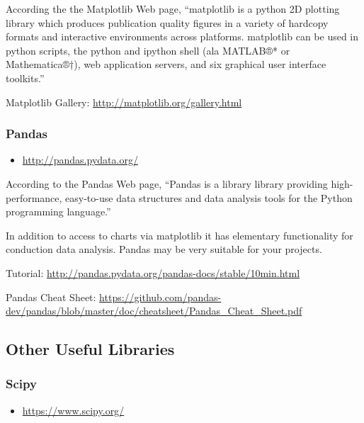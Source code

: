 According the the Matplotlib Web page, ``matplotlib is a python 2D
plotting library which produces publication quality figures in a
variety of hardcopy formats and interactive environments across
platforms. matplotlib can be used in python scripts, the python and
ipython shell (ala MATLAB®* or Mathematica®†), web application
servers, and six graphical user interface toolkits.''

Matplotlib Gallery: \url{http://matplotlib.org/gallery.html}


\subsubsection{Pandas}
\label{\detokenize{lesson/prg/python_big_data:id5}}\begin{itemize}
\item {} 
\url{http://pandas.pydata.org/}

\end{itemize}

According to the Pandas Web page, ``Pandas is a library library
providing high-performance, easy-to-use data structures and data
analysis tools for the Python programming language.''

In addition to access to charts via matplotlib it has elementary
functionality for conduction data analysis. Pandas may be very
suitable for your projects.

Tutorial: \url{http://pandas.pydata.org/pandas-docs/stable/10min.html}

Pandas Cheat Sheet:
\url{https://github.com/pandas-dev/pandas/blob/master/doc/cheatsheet/Pandas\_Cheat\_Sheet.pdf}


\subsection{Other Useful Libraries}
\label{\detokenize{lesson/prg/python_big_data:other-useful-libraries}}

\subsubsection{Scipy}
\label{\detokenize{lesson/prg/python_big_data:scipy}}\begin{itemize}
\item {} 
\url{https://www.scipy.org/}

\end{itemize}

